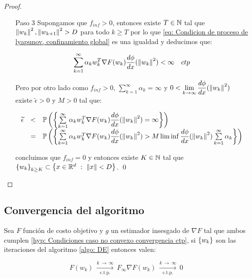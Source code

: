 \begin{proof}
\begin{enumerate}
		\item[Paso 3] Supongamos que $f_{inf} >0$, entonces existe $T \in {\mathbb{N}}$  tal que $\left\lVert w_k\right\rVert^2, \left\lVert w_{k+1}\right\rVert^2 > D$ para todo $k \geq T$ por lo que \ref{eq: Condicion de proceso de lyapunov, confinamiento global} es una igualdad y deducimos que:
		
		\begin{equation}
			\sum\limits_{k=1}^{\infty} {\alpha_k w_k^T\nabla F(w_k) \dfrac{d \phi}{dx}(\left\lVert w_k\right\rVert^2)} < \infty \quad ctp
		\end{equation}
		
		Pero por otro lado como $f_{inf} >0$, $\sum\limits_{k=1}^{\infty} {\alpha_k} = \infty$ y  $0 < \lim\limits_{k \to \infty} \dfrac{d \phi}{dx}(\left\lVert w_k\right\rVert^2)$ existe $\widetilde{\epsilon} > 0$ y $M > 0$ tal que:
		
		\begin{equation*}
			\begin{array}{rcl}
			\widetilde{\epsilon} & < & \mathbb{P} \left(\left\lbrace\sum\limits_{k=1}^{\infty} {\alpha_k w_k^T\nabla F(w_k) \dfrac{d \phi}{dx}(\left\lVert w_k\right\rVert^2)} = \infty \right\rbrace\right) \\
			& = & \mathbb{P} \left(\left\lbrace\sum\limits_{k=1}^{\infty} {\alpha_k w_k^T\nabla F(w_k) \dfrac{d \phi}{dx}(\left\lVert w_k\right\rVert^2)} > M \liminf \dfrac{d \phi}{dx}(\left\lVert w_k\right\rVert^2)\sum\limits_{k=1}^{\infty} {\alpha_k}\right\rbrace\right) 
			\end{array}
		\end{equation*}
		
		concluimos que $f_{inf} = 0$ y entonces existe $K \in {\mathbb{N}}$ tal que $\left\lbrace w_k\right\rbrace_{k \geq K} \subset \left\lbrace x \in {\mathbb{R}}^d ~:~ \left\lVert x\right\rVert < D \right\rbrace$. \qed
		
	\end{enumerate}
	
\end{proof}

\subsection{Convergencia del algoritmo}

\begin{theorem}
	Sea $F$ funci\'on de costo objetivo y $g$ un estimador insesgado de $\nabla F$ tal que ambos cumplen \ref{hyp: Condiciones caso no convexo convergencia ctp}, si $\left\lbrace w_k\right\rbrace$ son las iteraciones del algoritmo \ref{algo: DE} entonces valen:
	
		\begin{subequations}
		\begin{equation}
		F(w_k) \ \xrightarrow[\text{c.t.p.}]{k \ \rightarrow \ \infty } \ F_{\infty}
		\end{equation}
		\begin{equation}
		\nabla F(w_k) \ \xrightarrow[\text{c.t.p.}]{k \ \rightarrow \ \infty } \ 0
		\end{equation}
	\end{subequations}
	
\end{theorem}

